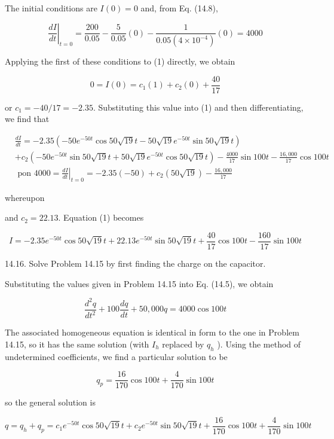 \documentclass[10pt]{article}
\begin{document}
The initial conditions are $I(0)=0$ and, from Eq. (14.8),

$$
\left.\frac{d I}{d t}\right|_{t=0}=\frac{200}{0.05}-\frac{5}{0.05}(0)-\frac{1}{0.05\left(4 \times 10^{-4}\right)}(0)=4000
$$

Applying the first of these conditions to (1) directly, we obtain

$$
0=I(0)=c_{1}(1)+c_{2}(0)+\frac{40}{17}
$$

or $c_{1}=-40 / 17=-2.35$. Substituting this value into (1) and then differentiating, we find that

$$
\begin{aligned}
& \frac{d I}{d t}=-2.35\left(-50 e^{-50 t} \cos 50 \sqrt{19} t-50 \sqrt{19} e^{-50 t} \sin 50 \sqrt{19} t\right) \\
& +c_{2}\left(-50 e^{-50 t} \sin 50 \sqrt{19} t+50 \sqrt{19} e^{-50 t} \cos 50 \sqrt{19} t\right)-\frac{4000}{17} \sin 100 t-\frac{16,000}{17} \cos 100 t \\
& \text { pon } 4000=\left.\frac{d I}{d t}\right|_{t=0}=-2.35(-50)+c_{2}(50 \sqrt{19})-\frac{16,000}{17}
\end{aligned}
$$

whereupon

and $c_{2}=22.13$. Equation (1) becomes

$$
I=-2.35 e^{-50 t} \cos 50 \sqrt{19} t+22.13 e^{-50 t} \sin 50 \sqrt{19} t+\frac{40}{17} \cos 100 t-\frac{160}{17} \sin 100 t
$$

14.16. Solve Problem 14.15 by first finding the charge on the capacitor.

Substituting the values given in Problem 14.15 into Eq. (14.5), we obtain

$$
\frac{d^{2} q}{d t^{2}}+100 \frac{d q}{d t}+50,000 q=4000 \cos 100 t
$$

The associated homogeneous equation is identical in form to the one in Problem 14.15, so it has the same solution (with $I_{h}$ replaced by $q_{h}$ ). Using the method of undetermined coefficients, we find a particular solution to be

$$
q_{p}=\frac{16}{170} \cos 100 t+\frac{4}{170} \sin 100 t
$$

so the general solution is


\begin{equation*}
q=q_{h}+q_{p}=c_{1} e^{-50 t} \cos 50 \sqrt{19} t+c_{2} e^{-50 t} \sin 50 \sqrt{19} t+\frac{16}{170} \cos 100 t+\frac{4}{170} \sin 100 t \tag{1}
\end{equation*}
\end{document}

